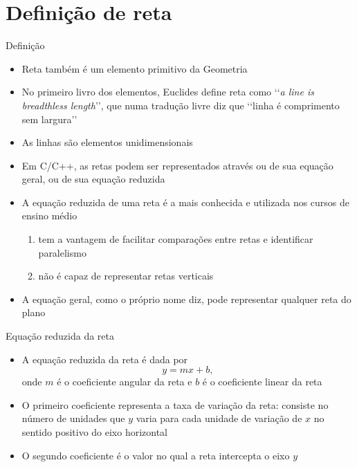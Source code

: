 \section{Definição de reta}

\begin{frame}[fragile]{Definição}

    \begin{itemize}
        \item Reta também é um elemento primitivo da Geometria

        \item No primeiro livro dos elementos, Euclides define reta como 
            \lq\lq \textit{a line is breadthless length}\rq\rq, que numa tradução livre 
            diz que \lq\lq linha é comprimento sem largura\rq\rq

        \item As linhas são elementos unidimensionais

        \item Em C/C++, as retas podem ser representados através ou de sua equação geral, ou de
            sua equação reduzida

        \item  A equação reduzida de uma reta é a mais conhecida e utilizada nos cursos de ensino médio
        \begin{enumerate}
            \item tem a vantagem de facilitar comparações entre retas e identificar paralelismo
            \item não é capaz de representar retas verticais
        \end{enumerate}

        \item A equação geral, como o próprio nome diz, pode representar qualquer reta do plano
   \end{itemize}

\end{frame}

\begin{frame}[fragile]{Equação reduzida da reta}

    \begin{itemize}
        \item A equação reduzida da reta é dada por
        \[
            y = mx + b,
        \]
        onde $m$ é o coeficiente angular da reta e $b$ é o coeficiente linear da reta

        \item O primeiro coeficiente representa a taxa de variação da reta: consiste no número de 
        unidades que $y$ varia para cada unidade de variação de $x$ no sentido positivo do eixo horizontal

        \item O segundo coeficiente é o valor no qual a reta intercepta o eixo $y$


    \end{itemize}

\end{frame}

